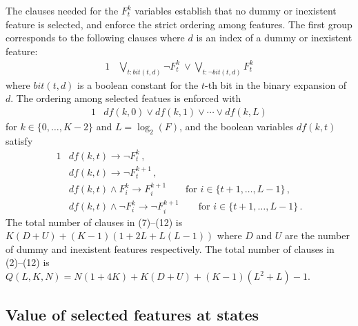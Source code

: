 \documentclass[10pt]{article}
\begin{document}
\medskip\noindent
The clauses needed for the $F^k_t$ variables establish that no dummy
or inexistent feature is selected, and enforce the strict ordering
among features. The first group corresponds to the following clauses
where $d$ is an index of a dummy or inexistent feature:
\begin{alignat}{1}
  &\bigvee_{t:bit(t,d)} \neg F^k_t \ \lor \bigvee_{t:\neg bit(t,d)} F^k_t
\end{alignat}
where $bit(t,d)$ is a boolean constant for the $t$-th bit in the binary
expansion of $d$.  The ordering among selected featues is enforced with
\begin{alignat}{1}
  &df(k,0) \lor df(k,1) \lor \cdots \lor df(k,L)
\end{alignat}
for $k\in\{0,\ldots,K-2\}$ and $L=\log_2(F)$, and the boolean
variables $df(k,t)$ satisfy
\begin{alignat}{1}
  &df(k,t) \rightarrow \neg F^k_t \,, \\
  &df(k,t) \rightarrow \neg F^{k+1}_t \,, \\
  &df(k,t) \land F^k_i \rightarrow F^{k+1}_i \qquad \text{for $i\in\{t+1,\ldots,L-1\}$} \,, \\
  &df(k,t) \land \neg F^k_i \rightarrow \neg F^{k+1}_i \qquad \text{for $i\in\{t+1,\ldots,L-1\}$} \,.
\end{alignat}
The total number of clauses in (7)--(12) is $K(D+U) + (K-1)(1 + 2L + L(L-1))$
where $D$ and $U$ are the number of dummy and inexistent features respectively.
The total number of clauses in (2)--(12) is
$Q(L,K,N)=N(1+4K) + K(D+U) + (K-1)(L^2 + L) - 1$.


\subsection{Value of selected features at states}
\end{document}
